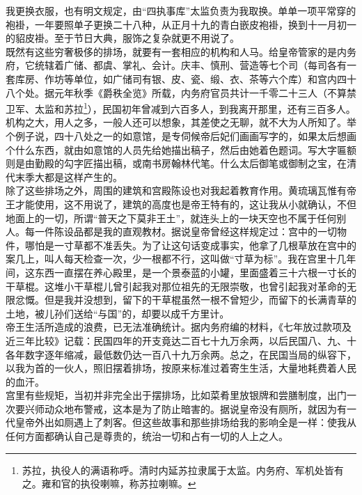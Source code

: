 我更换衣服，也有明文规定，由“四执事库”太监负责为我取换。单单一项平常穿的袍褂，一年要照单子更换二十八种，从正月十九的青白嵌皮袍褂，换到十一月初一的貂皮褂。至于节日大典，服饰之复杂就更不用说了。\\

既然有这些穷奢极侈的排场，就要有一套相应的机构和人马。给皇帝管家的是内务府，它统辖着广储、都虞、掌礼、会计。庆丰、慎刑、营造等七个司（每司各有一套库房、作坊等单位，如广储司有银、皮、瓷、缎、衣、茶等六个库）和宫内四十八个处。据元年秋季《爵秩全览》所载，内务府官员共计一千零二十三人（不算禁卫军、太监和苏拉\footnote{苏拉，执役人的满语称呼。清时内延苏拉隶属于太监。内务府、军机处皆有之。雍和官的执役喇嘛，称苏拉喇嘛。}），民国初年曾减到六百多人，到我离开那里，还有三百多人。机构之大，用人之多，一般人还可以想象，其差使之无聊，就不大为人所知了。举个例子说，四十八处之一的如意馆，是专伺候帝后妃们画画写字的，如果太后想画个什么东西，就由如意馆的人员先给她描出稿子，然后由她着色题词。写大字匾额则是由勤殿的勾字匠描出稿，或南书房翰林代笔。什么太后御笔或御制之宝，在清代末季大都是这样产生的。\\

除了这些排场之外，周围的建筑和宫殿陈设也对我起着教育作用。黄琉璃瓦惟有帝王才能使用，这不用说了，建筑的高度也是帝王特有的，这让我从小就确认，不但地面上的一切，所谓“普天之下莫非王土”，就连头上的一块天空也不属于任何别人。每一件陈设品都是我的直观教材。据说皇帝曾经这样规定过：宫中的一切物件，哪怕是一寸草都不准丢失。为了让这句话变成事实，他拿了几根草放在宫中的案几上，叫人每天检查一次，少一根都不行，这叫做“寸草为标”。我在宫里十几年间，这东西一直摆在养心殿里，是一个景泰蓝的小罐，里面盛着三十六根一寸长的干草棍。这堆小干草棍儿曾引起我对那位祖先的无限崇敬，也曾引起我对革命的无限忿慨。但是我并没想到，留下的干草棍虽然一根不曾短少，而留下的长满青草的土地，被儿孙们送给“与国”的，却要以成千方里计。\\

帝王生活所造成的浪费，已无法准确统计。据内务府编的材料，《七年放过款项及近三年比较》记载：民国四年的开支竟达二百七十九万余两，以后民国八、九、十各年数字逐年缩减，最低数仍达一百八十九万余两。总之，在民国当局的纵容下，以我为首的一伙人，照旧摆着排场，按原来标准过着寄生生活，大量地耗费着人民的血汗。\\

宫里有些规矩，当初并非完全出于摆排场，比如菜肴里放银牌和尝膳制度，出门一次要兴师动众地布警戒，这本是为了防止暗害的。据说皇帝没有厕所，就因为有一代皇帝外出如厕遇上了刺客。但这些故事和那些排场给我的影响全是一样：使我从任何方面都确认自己是尊贵的，统治一切和占有一切的人上之人。

